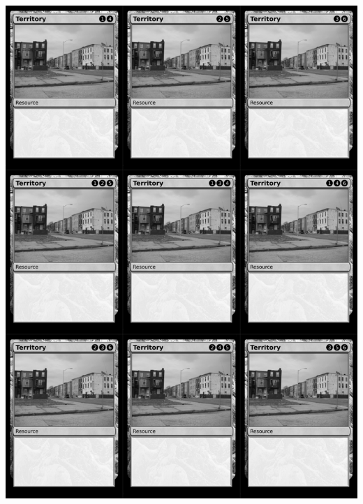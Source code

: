 \documentclass[a4paper]{article}
\begin{document}
\begin{center}
	\centering
	\includegraphics[width=200.5mm,height=280.7mm]{output/temp/page1.png}
\end{center}
\end{document}
